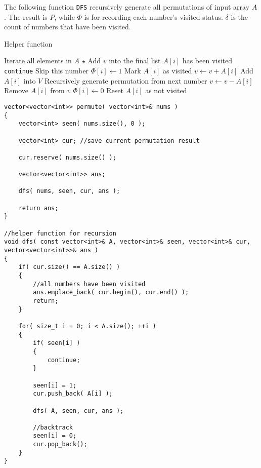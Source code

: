 The following function \texttt{DFS} recursively generate all permutations of input array $A$. The result is $P$, while $\Phi$ is for recording each number's visited status. $\delta$ is the count of numbers that have been visited.
\begin{algorithm}[H]
\caption{Helper function}
\begin{algorithmic}[1]
 \Comment Iterate all elements in $A$
\State $\star$ Add $v$ into the final list
\Else
{}
 \Comment $A[i]$ has been visited
\State \texttt{continue} \Comment Skip this number
\EndIf
\State $\Phi[i] \gets 1$ \Comment Mark $A[i]$ as visited
\State $v \gets v + A[i]$ \Comment Add $A[i]$ into $V$
\State {} \Comment Recursively generate permutation from next number
\State $v \gets v - A[i]$ \Comment Remove $A[i]$ from $v$
\State $\Phi[i] \gets 0$ \Comment Reset $A[i]$ as not visited
\EndFor
\EndIf
\EndFunction
\end{algorithmic}
\end{algorithm}

\setcounter{lstlisting}{0}
\begin{lstlisting}[style=customc, caption={Recursive With Visited Status}]
vector<vector<int>> permute( vector<int>& nums )
{
    vector<int> seen( nums.size(), 0 );

    vector<int> cur; //save current permutation result

    cur.reserve( nums.size() );

    vector<vector<int>> ans;

    dfs( nums, seen, cur, ans );

    return ans;
}

//helper function for recursion
void dfs( const vector<int>& A, vector<int>& seen, vector<int>& cur, vector<vector<int>>& ans )
{
    if( cur.size() == A.size() )
    {
        //all numbers have been visited
        ans.emplace_back( cur.begin(), cur.end() );
        return;
    }

    for( size_t i = 0; i < A.size(); ++i )
    {
        if( seen[i] )
        {
            continue;
        }

        seen[i] = 1;
        cur.push_back( A[i] );

        dfs( A, seen, cur, ans );

        //backtrack
        seen[i] = 0;
        cur.pop_back();
    }
}
\end{lstlisting}


